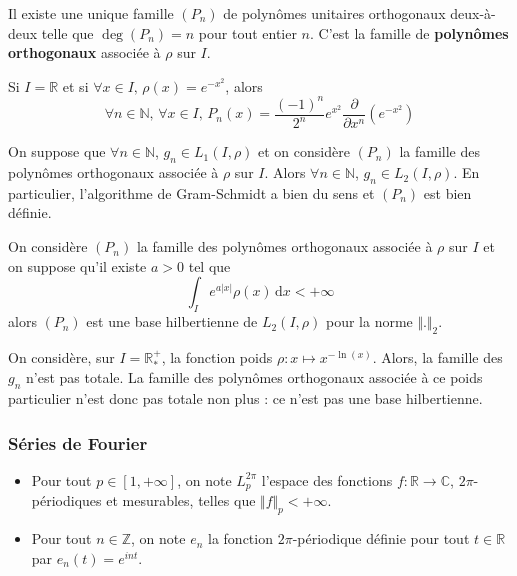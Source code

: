   \begin{theorem}
    Il existe une unique famille $(P_n)$ de polynômes unitaires orthogonaux deux-à-deux telle que $\deg(P_n) = n$ pour tout entier $n$. C'est la famille de \textbf{polynômes orthogonaux} associée à $\rho$ sur $I$.
  \end{theorem}

  \begin{example}
    Si $I = \mathbb{R}$ et si $\forall x \in I, \, \rho(x) = e^{-x^2}$, alors
    \[ \forall n \in \mathbb{N}, \, \forall x \in I, \, P_n(x) = \frac{(-1)^n}{2^n} e^{x^2} \frac{\partial}{\partial x^n} \left( e^{-x^2} \right) \]
  \end{example}


  \begin{lemma}
    On suppose que $\forall n \in \mathbb{N}$, $g_n \in L_1(I, \rho)$ et on considère $(P_n)$ la famille des polynômes orthogonaux associée à $\rho$ sur $I$. Alors $\forall n \in \mathbb{N}$, $g_n \in L_2(I, \rho)$. En particulier, l'algorithme de Gram-Schmidt a bien du sens et $(P_n)$ est bien définie.
  \end{lemma}

  \begin{application}
    On considère $(P_n)$ la famille des polynômes orthogonaux associée à $\rho$ sur $I$ et on suppose qu'il existe $a > 0$ tel que
    \[ \int_I e^{a \vert x \vert} \rho(x) \, \mathrm{d}x < +\infty \]
    alors $(P_n)$ est une base hilbertienne de $L_2(I, \rho)$ pour la norme $\Vert . \Vert_2$.
  \end{application}

  \begin{cexample}
    On considère, sur $I = \mathbb{R}^+_*$, la fonction poids $\rho : x \mapsto x^{-\ln(x)}$. Alors, la famille des $g_n$ n'est pas totale. La famille des polynômes orthogonaux associée à ce poids particulier n'est donc pas totale non plus : ce n'est pas une base hilbertienne.
  \end{cexample}

  \subsubsection{Séries de Fourier}


  \begin{notation}
    \begin{itemize}
      \item Pour tout $p \in [1, +\infty]$, on note $L_p^{2\pi}$ l'espace des fonctions $f : \mathbb{R} \rightarrow \mathbb{C}$, $2\pi$-périodiques et mesurables, telles que $\Vert f \Vert_p < +\infty$.
      \item Pour tout $n \in \mathbb{Z}$, on note $e_n$ la fonction $2\pi$-périodique définie pour tout $t \in \mathbb{R}$ par $e_n(t) = e^{int}$.
    \end{itemize}
  \end{notation}

